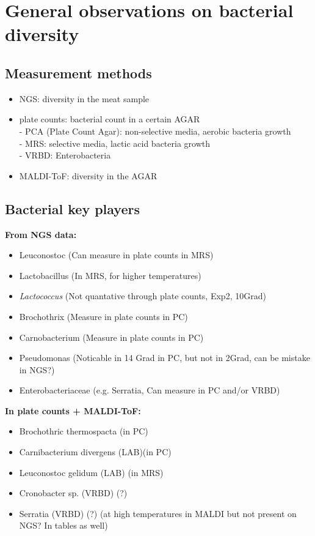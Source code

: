 \documentclass[10pt,A4paper]{article}
\begin{document}
\tableofcontents
\section{General observations on bacterial diversity}
\subsection{Measurement methods}
\begin{itemize}
    \item NGS: diversity in the meat sample
    
    \item plate counts: bacterial count in a certain AGAR\\
        - PCA (Plate Count Agar): non-selective media, aerobic bacteria growth\\
        - MRS: selective media, lactic acid bacteria growth\\
        - VRBD: Enterobacteria

    \item MALDI-ToF: diversity in the AGAR

\end{itemize}

\subsection{Bacterial key players}
\textbf{From NGS data:}
\begin{itemize}
    \item Leuconostoc (Can measure in plate counts in MRS)
    \item Lactobacillus (In MRS, for higher temperatures)
    \item \textit{Lactococcus} (Not quantative through plate counts, Exp2, 10Grad)
    \item Brochothrix  (Measure in plate counts in PC)
    \item Carnobacterium (Measure in plate counts in PC)
    \item Pseudomonas (Noticable in 14 Grad in PC, but not in 2Grad, can be mistake in NGS?)
    \item Enterobacteriaceae (e.g. Serratia, Can measure in PC and/or VRBD)
\end{itemize}


\textbf{In plate counts + MALDI-ToF:}
\begin{itemize}
    \item Brochothric thermospacta (in PC)
    \item Carnibacterium divergens (LAB)(in PC)
    \item Leuconostoc gelidum (LAB) (in MRS)
    
    \item Cronobacter sp. (VRBD) (?)
    \item Serratia (VRBD) (?) (at high temperatures in MALDI but not present on NGS? In tables as well)
\end{itemize}
\end{document}
